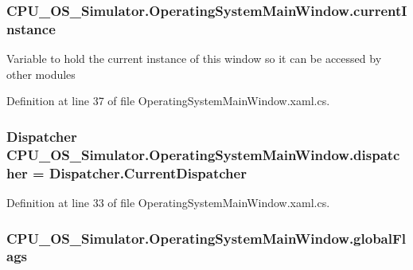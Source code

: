 \subsubsection[{current\+Instance}]{ C\+P\+U\+\_\+\+O\+S\+\_\+\+Simulator.\+Operating\+System\+Main\+Window.\+current\+Instance\hspace{0.3cm}{\ttfamily [static]}}\label{class_c_p_u___o_s___simulator_1_1_operating_system_main_window_ac659b34226b30276331daba60ec7d439}


Variable to hold the current instance of this window so it can be accessed by other modules 



Definition at line 37 of file Operating\+System\+Main\+Window.\+xaml.\+cs.

\hypertarget{class_c_p_u___o_s___simulator_1_1_operating_system_main_window_ac0f8e9dfcaba558927c53e11815fb0fb}{}
\subsubsection[{dispatcher}]{\setlength{\rightskip}{0pt plus 5cm}Dispatcher C\+P\+U\+\_\+\+O\+S\+\_\+\+Simulator.\+Operating\+System\+Main\+Window.\+dispatcher = Dispatcher.\+Current\+Dispatcher\hspace{0.3cm}{\ttfamily [private]}}\label{class_c_p_u___o_s___simulator_1_1_operating_system_main_window_ac0f8e9dfcaba558927c53e11815fb0fb}


Definition at line 33 of file Operating\+System\+Main\+Window.\+xaml.\+cs.

\hypertarget{class_c_p_u___o_s___simulator_1_1_operating_system_main_window_a905f81a88e7878e936352f6da9ffcb93}{}
\subsubsection[{global\+Flags}]{ C\+P\+U\+\_\+\+O\+S\+\_\+\+Simulator.\+Operating\+System\+Main\+Window.\+global\+Flags\hspace{0.3cm}{\ttfamily [private]}}\label{class_c_p_u___o_s___simulator_1_1_operating_system_main_window_a905f81a88e7878e936352f6da9ffcb93}


